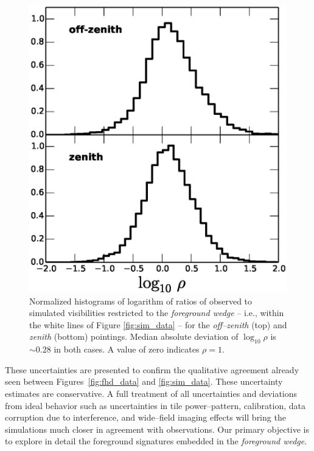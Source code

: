 \documentclass[preprint2,iop,numberedappendix]{emulateapj}
\begin{document}
\begin{figure}[htb]
\centering
\includegraphics[width=\linewidth]{figures/v1_0/delta_array_histogram_wedge_sim_data_log_ratio_0.3m_ground_custom_gaussian_FG_model_asm_all_sky_nside_64_Tsys_95.0K_185.0_MHz_30.7_MHz_bhw2.0.eps}
\caption{Normalized histograms of logarithm of ratios of observed to simulated visibilities restricted to the {\it foreground wedge} -- i.e., within the white lines of Figure \ref{fig:sim_data} -- for the {\it off--zenith} (top) and {\it zenith} (bottom) pointings. Median absolute deviation of $\log_{10}\rho$ is $\sim 0.28$ in both cases. A value of zero indicates $\rho=1$. \label{fig:data-sim-ratio}}
\end{figure}

These uncertainties are presented to confirm the qualitative agreement already seen between Figures~\ref{fig:fhd_data} and \ref{fig:sim_data}. These uncertainty estimates are conservative. A full treatment of all uncertainties and deviations from ideal behavior such as uncertainties in tile power--pattern, calibration, data corruption due to interference, and wide--field imaging effects will bring the simulations much closer in agreement with observations. Our primary objective is to explore in detail the foreground signatures embedded in the {\it foreground wedge}.
\end{document}
